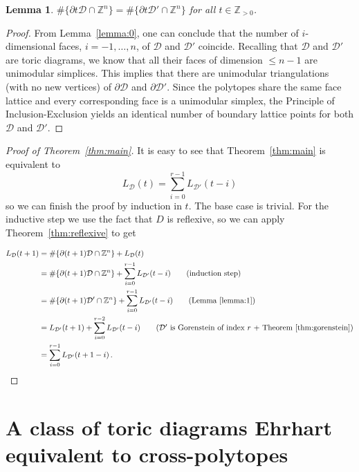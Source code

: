 \documentclass[a4paper,11pt,reqno]{amsart}
\newtheorem{lemma}[theorem]{Lemma}
\begin{document}
\begin{lemma}\label{lemma:1}
$\#\{\partial t \mathcal{D} \cap \mathbb{Z}^n \} = \#\{\partial t \mathcal{D}' \cap \mathbb{Z}^n \}$ 
for all $t \in \mathbb{Z}_{>0}$.
\end{lemma}
\begin{proof}
From Lemma~\ref{lemma:0}, one can conclude that the number of $i$-dimensional faces,
$i=-1, \dots, n$, of $\mathcal{D}$ and $\mathcal{D}'$ coincide. Recalling that $\mathcal{D}$ and $\mathcal{D}'$ 
are toric diagrams, we know that all their faces of dimension $\leq n-1$ are unimodular simplices.
This implies that there are unimodular triangulations (with no new vertices) of $\partial \mathcal{D}$ 
and $\partial \mathcal{D}'$. Since the polytopes share the same face lattice and every corresponding 
face is a unimodular simplex, the Principle of Inclusion-Exclusion yields an identical number of boundary 
lattice points for both $\mathcal{D}$ and $\mathcal{D}'$.
\end{proof}

\begin{proof}[Proof of Theorem~\ref{thm:main}]
It is easy to see that Theorem~\ref{thm:main} is equivalent to
\[
L_{\mathcal{D}}(t)=\sum_{i=0}^{r-1} L_{\mathcal{D}'}(t-i)
\]
so we can finish the proof by induction in $t$. The base case is trivial. For the inductive step we use
the fact that $D$ is reflexive, so we can apply Theorem~\ref{thm:reflexive} to get

\begin{align*}
	L_{\mathcal{D}}(t+1)
	&=\#\{\partial (t+1) \mathcal{D} \cap \mathbb{Z}^n \}+L_{\mathcal{D}}(t) \\
	&=\#\{\partial (t+1) \mathcal{D} \cap \mathbb{Z}^n \}+\sum_{i=0}^{r-1}  L_{\mathcal{D}'}(t-i) 
	\tag{induction step} \\
	&=\#\{\partial (t+1) \mathcal{D}' \cap \mathbb{Z}^n \}+\sum_{i=0}^{r-1} L_{\mathcal{D}'}(t-i)	
	\tag{Lemma~\ref{lemma:1}} \\
	&=L_{\mathcal{D}'}(t+1)+\sum_{i=0}^{r-2} L_{\mathcal{D}'}(t-i) 
	\tag{$\mathcal{D}'$ is Gorenstein of index $r$ + Theorem~\ref{thm:gorenstein}} \\
	&=\sum_{i=0}^{r-1} L_{\mathcal{D}'}(t+1-i) \,.
\end{align*}
\end{proof}


\section{A class of toric diagrams Ehrhart equivalent to cross-polytopes} \label{sec:ppyr}
\end{document}
